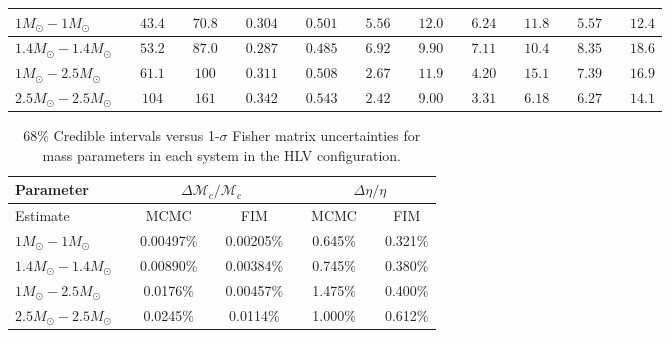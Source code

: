 \documentclass[11pt,a4paper]{emulateapj} 
\begin{document}
\begin{table}[t!]
{\begin{tabular}{lcccccccccccccccccccc}
$1M_{\odot}-1M_{\odot}$ & \vline &$43.4$ & \vline &$70.8$ & \vline & $0.304$ & \vline &$0.501$ & \vline & $5.56$ & \vline &$12.0$ & \vline & $6.24$ & \vline &$11.8$ & \vline & $5.57$ & \vline &$12.4$\\\hline$1.4M_{\odot}-1.4M_{\odot}$ & \vline &$53.2$ & \vline &$87.0$ & \vline & $0.287$ & \vline &$0.485$ & \vline & $6.92$ & \vline &$9.90$ & \vline & $7.11$ & \vline &$10.4$ & \vline & $8.35$ & \vline &$18.6$\\\hline$1M_{\odot}-2.5M_{\odot}$ & \vline &$61.1$ & \vline &$100$ & \vline & $0.311$ & \vline &$0.508$ & \vline & $2.67$ & \vline &$11.9$ & \vline & $4.20$ & \vline &$15.1$ & \vline & $7.39$ & \vline &$16.9$\\\hline$2.5M_{\odot}-2.5M_{\odot}$ & \vline &$104$ & \vline &$161$ & \vline & $0.342$ & \vline &$0.543$ & \vline & $2.42$ & \vline &$9.00$ & \vline & $3.31$ & \vline &$6.18$ & \vline & $6.27$ & \vline &$14.1$\\

\hline\hline


\end{tabular}}
\label{ciTableExtrinsic}
\end{table}


\begin{table}[b!]
\centering
\caption{68\% Credible intervals versus 1-$\sigma$ Fisher matrix uncertainties for mass parameters in each system in the HLV configuration.}
  \tabcolsep=0.11cm
    {\renewcommand{\arraystretch}{1.3} 
\begin{tabular}{lcccccccc}

\hline\hline Parameter & \vline & \multicolumn{3}{c}{$\Delta\mathcal{M}_c / \mathcal{M}_c$} & \vline & \multicolumn{3}{c}{$\Delta \eta / \eta$} \\ \hline \hline

Estimate & \vline & MCMC & \vline & FIM & \vline & MCMC & \vline & FIM \\ \hline

$1M_{\odot}-1M_{\odot}$ & \vline &  0.00497\% & \vline & 0.00205\% & \vline & 0.645\% & \vline & 0.321\% \\
$1.4M_{\odot}-1.4M_{\odot}$ & \vline &  0.00890\% & \vline & 0.00384\% & \vline & 0.745\% & \vline & 0.380\% \\
$1M_{\odot}-2.5M_{\odot}$& \vline &  0.0176\% & \vline & 0.00457\% & \vline & 1.475\% & \vline & 0.400\% \\
$2.5M_{\odot}-2.5M_{\odot}$& \vline &  0.0245\% & \vline & 0.0114\% & \vline & 1.000\% & \vline & 0.612\% \\

\hline\hline

\end{tabular}}
\label{FIMvsMCMC}
\end{table}
\end{document}
